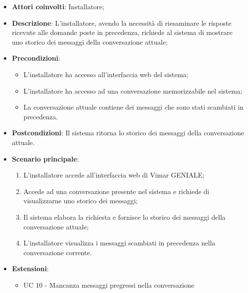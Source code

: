 \begin{itemize}
    \item \textbf{Attori coinvolti}: Installatore;
    \item \textbf{Descrizione}: L’installatore, avendo la necessità di riesaminare le risposte ricevute alle domande poste in precedenza, richiede al sistema di mostrare uno storico dei messaggi della conversazione attuale;
    \item \textbf{Precondizioni}: 
        \begin{itemize}
            \item L’installatore ha accesso all’interfaccia web del sistema;
            \item L’installatore ha accesso ad una conversazione memorizzabile nel sistema;
            \item La conversazione attuale contiene dei messaggi che sono stati scambiati in precedenza.
        \end{itemize}
    \item \textbf{Postcondizioni}: Il sistema ritorna lo storico dei messaggi della conversazione attuale.
    \item \textbf{Scenario principale}:
    \begin{enumerate}
    \item L’installatore accede all’interfaccia web di Vimar GENIALE;
    \item Accede ad una conversazione presente nel sistema e richiede di visualizzarne uno storico dei messaggi;
    \item Il sistema elabora la richiesta e fornisce lo storico dei messaggi della conversazione attuale;
    \item L’installatore visualizza i messaggi scambiati in precedenza nella conversazione corrente.
    \end{enumerate}
    \item \textbf{Estensioni}: 
        \begin{itemize}
            \item UC 10 - Mancanza messaggi pregressi nella conversazione
        \end{itemize}
\end{itemize}

